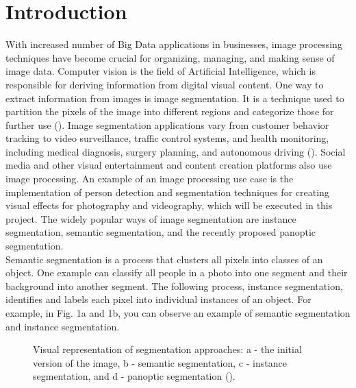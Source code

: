 \documentclass[english]{sbrt}
\begin{document}
\section{Introduction}
With increased number of Big Data applications in businesses, image processing techniques have become crucial for organizing, managing, and making sense of image data. Computer vision is the field of Artificial Intelligence, which is responsible for deriving information from digital visual content. One way to extract information from images is image segmentation. It is a technique used to partition the pixels of the image into different regions and categorize those for further use  (\cite{shapiro_2000_computer}).
Image segmentation applications vary from customer behavior tracking to video surveillance, traffic control systems, and health monitoring, including medical diagnosis, surgery planning, and autonomous driving (\cite{vadapalli_2021_image}). Social media and other visual entertainment and content creation platforms also use image processing. An example of an image processing use case is the implementation of person detection and segmentation techniques for creating visual effects for photography and videography, which will be executed in this project. The widely popular ways of image segmentation are instance segmentation, semantic segmentation, and the recently proposed panoptic segmentation. 
\\ \indent Semantic segmentation is a process that clusters all pixels into classes of an object. One example can classify all people in a photo into one segment and their background into another segment. 
The following process, instance segmentation, identifies and labels each pixel into individual instances of an object. For example, in Fig. 1a and 1b, you can observe an example of semantic segmentation and instance segmentation.

\begin{figure}[hbt]
\centering 
{}
\caption{\label{fig:fig1} Visual representation of segmentation approaches: a - the initial version of the image, b - semantic segmentation, c - instance segmentation, and d - panoptic segmentation (\cite{barla_2022_panoptic}).}
\end{figure}
\end{document}
